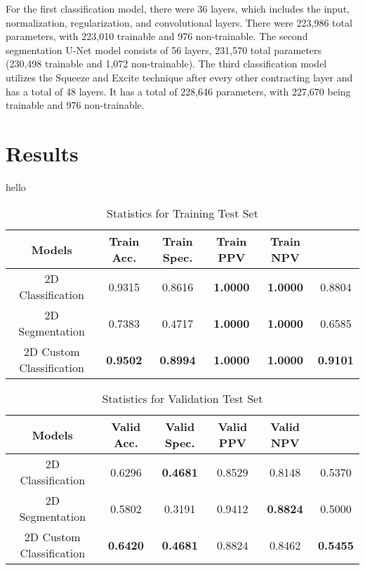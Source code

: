 \documentclass [12pt, letterpaper] {article}
\begin{document}
For the first classification model, there were 36 layers, which includes the input, normalization, regularization, and convolutional layers. There were 223,986 total parameters, with 223,010 trainable and 976 non-trainable. The second segmentation U-Net model consists of 56 layers, 231,570 total parameters (230,498 trainable and 1,072 non-trainable). The third classification model utilizes the Squeeze and Excite technique after every other contracting layer and has a total of 48 layers. It has a total of 228,646 parameters, with 227,670 being trainable and 976 non-trainable. 

\section{Results}
hello

\begin{table}[h!]
\centering
\small
\begin{tabular}{ c c c c c c } 
 \hline
 Models & Train Acc. & Train Spec. & Train PPV & Train NPV\\  [0.5ex] 
 \hline
 2D Classification & 0.9315 & 0.8616 & \textbf{1.0000} & \textbf{1.0000} & 0.8804 \\
 2D Segmentation  & 0.7383 & 0.4717 & \textbf{1.0000} & \textbf{1.0000} & 0.6585 \\
 2D Custom Classification & \textbf{0.9502} & \textbf{0.8994} & \textbf{1.0000} & \textbf{1.0000} & \textbf{0.9101}\\

 \hline
\end{tabular}

\caption{Statistics for Training Test Set}
\label{table:data}
\end{table}

\begin{table}[h!]
\centering
\small
\begin{tabular}{ c c c c c c } 
 \hline
 Models & Valid Acc. & Valid Spec. & Valid PPV & Valid NPV \\  [0.5ex] 
 \hline
 2D Classification & 0.6296 & \textbf{0.4681} & 0.8529 & 0.8148 & 0.5370 \\
 2D Segmentation & 0.5802 & 0.3191 & 0.9412 & \textbf{0.8824} & 0.5000 \\
 2D Custom Classification & \textbf{0.6420} & \textbf{0.4681} & 0.8824 & 0.8462 & \textbf{0.5455}\\

\hline
\end{tabular}

\caption{Statistics for Validation Test Set}
\label{table:data}
\end{table}
\end{document}
